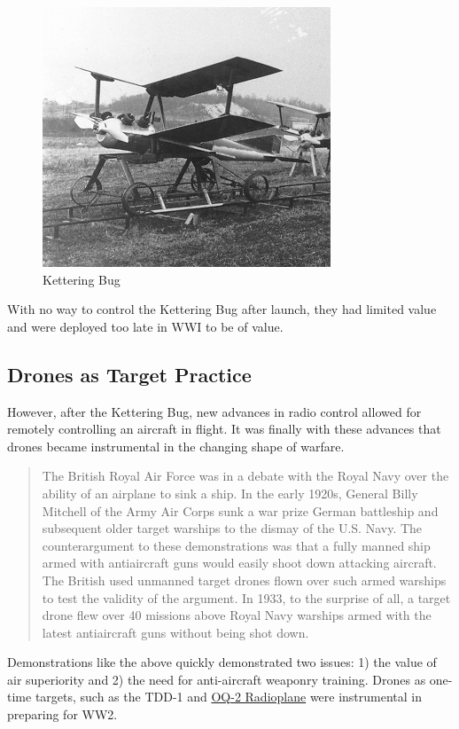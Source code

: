\documentclass[
]{book}
\theoremstyle{definition}
\theoremstyle{definition}
\theoremstyle{definition}
\theoremstyle{definition}
\theoremstyle{remark}
\begin{document}
\begin{figure}

{\centering \includegraphics[width=0.5\linewidth]{images/history/Kettering_Bug} 

}

\caption{Kettering Bug}\label{fig:kbug}
\end{figure}

With no way to control the Kettering Bug after launch, they had limited value and were deployed too late in WWI to be of value.

\hypertarget{drones-as-target-practice}{%
\subsection{Drones as Target Practice}\label{drones-as-target-practice}}

However, after the Kettering Bug, new advances in radio control allowed for remotely controlling an aircraft in flight. It was finally with these advances that drones became instrumental in the changing shape of warfare.

\begin{quote}
The British Royal Air Force was in a debate with the Royal Navy over the ability of an airplane to sink a ship. In the early 1920s, General Billy Mitchell of the Army Air Corps sunk a war prize German battleship and subsequent older target warships to the dismay of the U.S. Navy. The counterargument to these demonstrations was that a fully manned ship armed with antiaircraft guns would easily shoot down attacking aircraft. The British used unmanned target drones flown over such armed warships to test the validity of the argument. In 1933, to the surprise of all, a target drone flew over 40 missions above Royal Navy warships armed with the latest antiaircraft guns without being shot down.
\end{quote}

Demonstrations like the above quickly demonstrated two issues: 1) the value of air superiority and 2) the need for anti-aircraft weaponry training. Drones as one-time targets, such as the TDD-1 and \href{https://en.wikipedia.org/wiki/Radioplane_OQ-2}{OQ-2 Radioplane} were instrumental in preparing for WW2.
\end{document}
